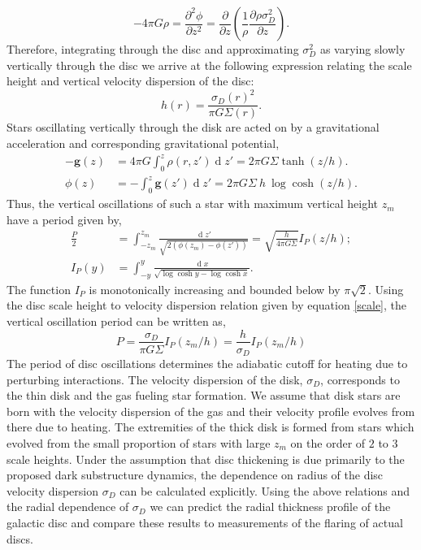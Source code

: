\documentclass[usenatbib]{mnras}
\renewcommand{\d}[1]{\! \mathrm{d}#1 \:}
\newcommand{\pderiv}[2]{\frac{\partial{#1}}{\partial{#2}}}
\renewcommand{\d}[1]{\ensuremath{\operatorname{d}\!{#1}}}
\begin{document}
\begin{equation}
- 4 \pi G \rho = \frac{\partial^2 \phi}{\partial z^2} = \pderiv{}{z} \left( \frac{1}{\rho} \pderiv{ \rho \sigma_D^2}{z} \right).
\end{equation}  
Therefore, integrating through the disc and approximating $\sigma_D^2$ as varying slowly vertically through the disc we arrive at the following expression relating the scale height and vertical velocity dispersion of the disc:
\begin{equation} \label{scale}
h(r) = \frac{\sigma_D(r)^2}{\pi G \Sigma(r)}.
\end{equation}
Stars oscillating vertically through the disk are acted on by a gravitational acceleration and corresponding gravitational potential,
\begin{subequations}
\begin{align}
-\mathbf{g}(z) & = 4 \pi G \int_0^z \rho(r, z') \d{z'} = 2 \pi G \Sigma \tanh{(z/h)}.
\\
\phi(z) & = - \int_0^z \mathbf{g}(z') \d{z'} = 2 \pi G \Sigma \: h \: \log{\cosh{(z / h)}}.
\end{align}
\end{subequations}
Thus, the vertical oscillations of such a star with maximum vertical height $z_m$ have a period given by,
\begin{subequations}
\begin{align}
\frac{P}{2} & = \int_{-z_m}^{z_m} \frac{\d{z'}}{\sqrt{2(\phi(z_m) - \phi(z'))}} = \sqrt{\frac{h}{4 \pi G \Sigma}} I_P(z / h) ;
\\
I_P(y) &= \int_{-y}^y \frac{\d{x}}{\sqrt{\log{\cosh{y}} - \log{\cosh{x}}}}.
\end{align}
\end{subequations}
The function $I_P$ is monotonically increasing and bounded below by $\pi \sqrt{2}$. 
Using the disc scale height to velocity dispersion relation given by equation \eqref{scale}, the vertical oscillation period can be written as,
\begin{equation} \label{period}
P = \frac{\sigma_D}{\pi G \Sigma} I_P(z_m / h) = \frac{h}{\sigma_D} I_P(z_m / h)
\end{equation}
The period of disc oscillations determines the adiabatic cutoff for heating due to perturbing interactions. The velocity dispersion of the disk, $\sigma_D$, corresponds to the thin disk and the gas fueling star formation. We assume that disk stars are born with the velocity dispersion of the gas and their velocity profile evolves from there due to heating. The extremities of the thick disk is formed from stars which evolved from the small proportion of stars with large $z_m$ on the order of $2$ to $3$ scale heights. Under the assumption that disc thickening is due primarily to the proposed dark substructure dynamics, the dependence on radius of the disc velocity dispersion $\sigma_D$ can be calculated explicitly. Using the above relations and the radial dependence of $\sigma_D$ we can predict the radial thickness profile of the galactic disc and compare these results to measurements of the flaring of actual discs.  
\end{document}
